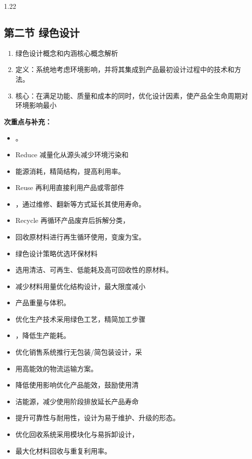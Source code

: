 \documentclass[12pt,a4paper]{article}
\begin{document}
\begin{spacing}{1.22}
\subsection{第二节 绿色设计}
\begin{tcolorbox}[colback=yellow!6,colframe=red!55!black,title=重点,left=1mm,right=1mm]
\begin{enumerate}[leftmargin=2.2em,label=\arabic*.]
  \item 绿色设计概念和内涵核心概念解析
  \item 定义：系统地考虑环境影响，并将其集成到产品最初设计过程中的技术和方法。
  \item 核心：在满足功能、质量和成本的同时，优化设计因素，使产品全生命周期对环境影响最小
\end{enumerate}
\end{tcolorbox}
\noindent\textbf{次重点与补充：}
\begin{itemize}[leftmargin=2.2em,label=--]
  \item 。
  \item Reduce 减量化从源头减少环境污染和
  \item 能源消耗，精简结构，提高利用率。
  \item Reuse 再利用直接利用产品或零部件
  \item ，通过维修、翻新等方式延长其使用寿命。
  \item Recycle 再循环产品废弃后拆解分类，
  \item 回收原材料进行再生循环使用，变废为宝。
  \item 绿色设计策略优选环保材料
  \item 选用清洁、可再生、低能耗及高可回收性的原材料。
  \item 减少材料用量优化结构设计，最大限度减小
  \item 产品重量与体积。
  \item 优化生产技术采用绿色工艺，精简加工步骤
  \item ，降低生产能耗。
  \item 优化销售系统推行无包装/简包装设计，采
  \item 用高能效的物流运输方案。
  \item 降低使用影响优化产品能效，鼓励使用清
  \item 洁能源，减少使用阶段排放延长产品寿命
  \item 提升可靠性与耐用性，设计为易于维护、升级的形态。
  \item 优化回收系统采用模块化与易拆卸设计，
  \item 最大化材料回收与重复利用率。
\end{itemize}


\end{spacing}
\end{document}
